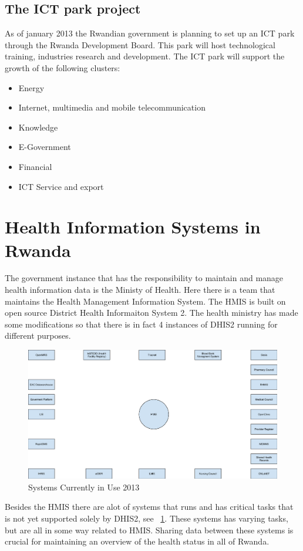 \subsection{The ICT park project}
As of january 2013 the Rwandian government is planning to set up an ICT park through the Rwanda Development Board.
This park will host technological training, industries research and development. The ICT park will support the growth of the following clusters:
\begin{itemize}
\item Energy
\item Internet, multimedia and mobile telecommunication
\item Knowledge
\item E-Government
\item Financial
\item ICT Service and export
\end{itemize}
\cite{2}

\section{Health Information Systems in Rwanda}
The government instance that has the responsibility to maintain and manage health information data is the Ministy of Health. Here there is a team that maintains the Health Management Information System.
The HMIS  is built on open source District Health Informaiton System 2. 
The health ministry has made some modifications so that there is in fact 4 instances of DHIS2 running for different purposes.
\begin{figure}
\centering
\includegraphics[width=12cm]{empirical/images/context.png}
\caption{Systems Currently in Use 2013}
\label{fig:systems_currently_in_use_2013}
\end{figure}
Besides the HMIS there are alot of systems that runs and has critical tasks that is not yet supported solely by DHIS2, see ~\ref{fig:systems_currently_in_use_2013}. These systems has varying tasks, but are all in some way related to HMIS.
Sharing data between these systems is crucial for maintaining an overview of the health status in all of Rwanda. 


